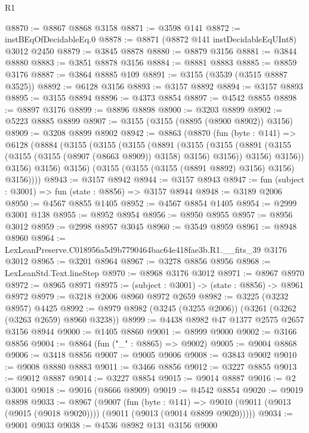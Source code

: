 \begin{lexlean}{R1}
\begin{coremodule}
@8870 := @8867 @8868 @3158
@8871 := @3598 @141
@8872 := instBEqOfDecidableEq.{0}
@8878 := @8871 (@8872 @141 instDecidableEqUInt8) @3012 @2450
@8879 := @3845 @8878
@8880 := @8879 @3156
@8881 := @3844 @8880
@8883 := @3851 @8878 @3156
@8884 := @8881 @8883
@8885 := @8859 @3176
@8887 := @3864 @8885 @109
@8891 := @3155 (@3539 (@3515 @8887 @3525))
@8892 := @6128 @3156
@8893 := @3157 @8892
@8894 := @3157 @8893
@8895 := @3155 @8894
@8896 := @4373 @8854
@8897 := @4542 @8855
@8898 := @8897 @3176
@8899 := @8896 @8898
@8900 := @3203 @8899
@8902 := @5223 @8885 @8899
@8907 := @3155 (@3155 (@8895 (@8900 @8902)) @3156)
@8909 := @3208 @8899 @8902
@8942 := @8863
    (@8870
      (fun (byte : @141) =>
      @6128
        (@8884
          (@3155
            (@3155
              (@3155
                (@8891
                  (@3155
                    (@3155
                      (@8891 (@3155 (@3155 (@3155 (@8907 (@8663 @8909)) @3158) @3156) @3156))
                      @3156)
                    @3156))
                @3156)
              @3156)
            @3156)
          (@3155 (@3155 (@3155 (@8891 @8892) @3156) @3156) @3156))))
@8943 := @3157 @8942
@8944 := @3157 @8943
@8947 := fun (subject : @3001) => fun (state : @8856) => @3157 @8944
@8948 := @3189 @2006
@8950 := @4567 @8855 @1405
@8952 := @4567 @8854 @1405
@8954 := @2999 @3001 @138
@8955 := @8952 @8954
@8956 := @8950 @8955
@8957 := @8956 @3012
@8959 := @2998 @8957 @3045
@8960 := @3549 @8959
@8961 := @8948 @8960
@8964 := LexLeanPreserve.C018956a5d9b7790464bac64e418fae3b.R1.__fits_39 @3176 @3012
@8965 := @3201 @8964
@8967 := @3278 @8856 @8956
@8968 := LexLeanStd.Text.lineStep
@8970 := @8968 @3176 @3012
@8971 := @8967 @8970
@8972 := @8965 @8971
@8975 := (subject : @3001) -> (state : @8856) -> @8961 @8972
@8979 := @3218 @2006 @8960 @8972 @2659
@8982 := @3225 (@3232 @8957) @4425
@8992 := @8979 @8982 (@3245 (@3255 @2006)) (@3261 (@3262 (@3263 @2659) @8960 @3238))
@8999 := @4438 @8982 @47 @1377 @2575 @2657 @3156 @8944
@9000 := @1405 @8860
@9001 := @8999 @9000
@9002 := @3166 @8856
@9004 := @8864 (fun ("_" : @8865) => @9002)
@9005 := @9004 @8868
@9006 := @3418 @8856
@9007 := @9005 @9006
@9008 := @3843 @9002
@9010 := @9008 @8880 @8883
@9011 := @3466 @8856
@9012 := @3227 @8855
@9013 := @9012 @8887
@9014 := @3227 @8854
@9015 := @9014 @8887
@9016 := @2 @3001
@9018 := @9016 (@8666 @8909)
@9019 := @4542 @8854
@9020 := @9019 @8898
@9033 := @8967
    (@9007
      (fun (byte : @141) =>
      @9010 (@9011 (@9013 (@9015 (@9018 @9020)))) (@9011 (@9013 (@9014 @8899 @9020)))))
@9034 := @9001 @9033
@9038 := @4536 @8982 @131 @3156 @9000

\end{coremodule}
\end{lexlean}
